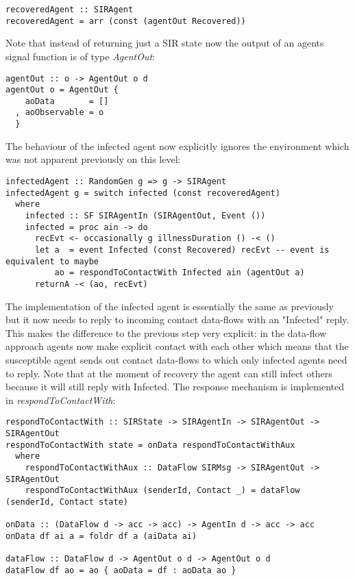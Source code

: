 \begin{verbatim}
recoveredAgent :: SIRAgent
recoveredAgent = arr (const (agentOut Recovered))
\end{verbatim}

Note that instead of returning just a SIR state now the output of an agents signal function is of type \textit{AgentOut}:

\begin{verbatim}
agentOut :: o -> AgentOut o d
agentOut o = AgentOut {
    aoData       = []
  , aoObservable = o
  }
\end{verbatim}

The behaviour of the infected agent now explicitly ignores the environment which was not apparent previously on this level:

\begin{verbatim}
infectedAgent :: RandomGen g => g -> SIRAgent
infectedAgent g = switch infected (const recoveredAgent)
  where
    infected :: SF SIRAgentIn (SIRAgentOut, Event ())
    infected = proc ain -> do
      recEvt <- occasionally g illnessDuration () -< ()
      let a  = event Infected (const Recovered) recEvt -- event is equivalent to maybe
          ao = respondToContactWith Infected ain (agentOut a)
      returnA -< (ao, recEvt)
\end{verbatim}

The implementation of the infected agent is essentially the same as previously but it now needs to reply to incoming contact data-flows with an "Infected" reply. This makes the difference to the previous step very explicit: in the data-flow approach agents now make explicit contact with each other which means that the susceptible agent sends out contact data-flows to which only infected agents need to reply. Note that at the moment of recovery the agent can still infect others because it will still reply with Infected. The response mechanism is implemented in \textit{respondToContactWith}:

\begin{verbatim}
respondToContactWith :: SIRState -> SIRAgentIn -> SIRAgentOut -> SIRAgentOut
respondToContactWith state = onData respondToContactWithAux
  where
    respondToContactWithAux :: DataFlow SIRMsg -> SIRAgentOut -> SIRAgentOut
    respondToContactWithAux (senderId, Contact _) = dataFlow (senderId, Contact state)
    
onData :: (DataFlow d -> acc -> acc) -> AgentIn d -> acc -> acc
onData df ai a = foldr df a (aiData ai)

dataFlow :: DataFlow d -> AgentOut o d -> AgentOut o d
dataFlow df ao = ao { aoData = df : aoData ao }
\end{verbatim}

